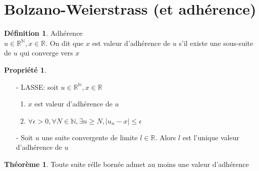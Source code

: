 \documentclass[fleqn]{article}
\theoremstyle{definition} \newtheorem*{defi}{D\'efinition}
\theoremstyle{definition} \newtheorem*{theo}{Th\'eor\`eme}
\theoremstyle{definition} \newtheorem*{prop}{Propri\'et\'e}
\theoremstyle{definition} \newtheorem*{coro}{Corollaire}
\theoremstyle{remark} \newtheorem*{rqs}{Remarque}
\begin{document}
\section{Bolzano-Weierstrass (et adh\'erence)}
\begin{defi} Adh\'erence \\
	$u \in \mathbb{R}^\mathbb{N}, x \in \mathbb{R}$.  On dit que $x$ est valeur d'adh\'erence de $u$ s'il existe une sous-suite de $u$
	qui converge vers $x$
\end{defi}
\begin{prop} $ $
	\begin{itemize}
		\item [-] LASSE: soit $u \in \mathbb{R}^\mathbb{N}, x \in \mathbb{R}$
		\begin{enumerate}
			\item $x$ est valeur d'adh\'erence de $u$
			\item $\forall \epsilon > 0, \forall N \in \mathbb{N}, \exists n \geq N, |u_n - x| \leq \epsilon$
		\end{enumerate}
		\item [-] Soit $u$ une suite convergente de limite $l \in \mathbb{R}$. Alors $l$ est l'unique valeur d'adh\'erence de $u$
	\end{itemize}
\end{prop}

\begin{theo}
	Toute suite r\'elle born\'ee admet au moins une valeur d'adh\'erence
\end{theo}

\end{document}
